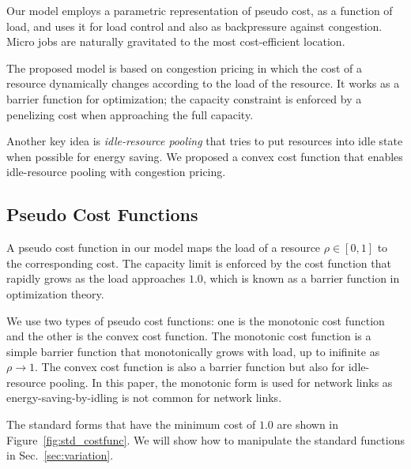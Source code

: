 

Our model employs a parametric representation of pseudo cost, as a
function of load, and uses it for load control and also as
backpressure against congestion.
Micro jobs are naturally gravitated to the most cost-efficient
location.

The proposed model is based on congestion pricing in which the cost of
a resource dynamically changes according to the load of the resource.
It works as a barrier function for optimization; the capacity
constraint is enforced by a penelizing cost when approaching the full
capacity.

Another key idea is {\em idle-resource pooling} that tries to put resources
into idle state when possible for energy saving.
We proposed a convex cost function that enables idle-resource pooling
with congestion pricing.

\subsection{Pseudo Cost Functions}

A pseudo cost function in our model maps the load of a resource
$\rho \in [0, 1]$ to the corresponding cost.
The capacity limit is enforced by the cost function that rapidly grows
as the load approaches $1.0$, which is known as a barrier function in
optimization theory. 

We use two types of pseudo cost functions: one is the monotonic cost
function and the other is the convex cost function.
The monotonic cost function is a simple barrier function that
monotonically grows with load, up to inifinite as $\rho \to 1$.
The convex cost function is also a barrier function but also for
idle-resource pooling.
In this paper, the monotonic form is used for network links as
energy-saving-by-idling is not common for network links.

The standard forms that have the minimum cost of $1.0$ are
shown in Figure~\ref{fig:std_costfunc}. We will show how to manipulate
the standard functions in Sec.~\ref{sec:variation}.

